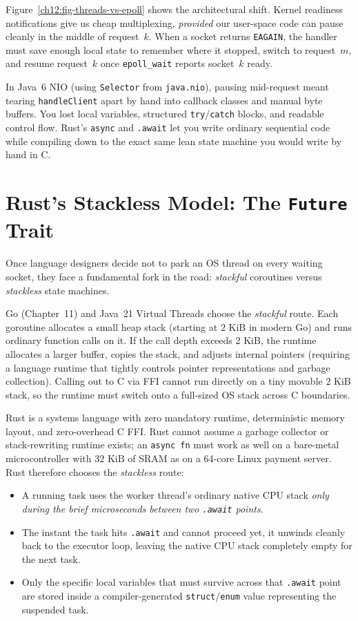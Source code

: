 Figure~\ref{ch12:fig-threads-vs-epoll} shows the architectural shift. Kernel readiness notifications give us cheap multiplexing, \emph{provided} our user-space code can pause cleanly in the middle of request~$k$. When a socket returns \texttt{EAGAIN}, the handler must save enough local state to remember where it stopped, switch to request~$m$, and resume request~$k$ once \texttt{epoll\_wait} reports socket~$k$ ready.

In Java~6 NIO (using \texttt{Selector} from \texttt{java.nio}), pausing mid-request meant tearing \texttt{handleClient} apart by hand into callback classes and manual byte buffers. You lost local variables, structured \texttt{try}/\texttt{catch} blocks, and readable control flow. Rust's \texttt{async} and \texttt{.await} let you write ordinary sequential code while compiling down to the exact same lean state machine you would write by hand in C.

\section{Rust's Stackless Model: The \texttt{Future} Trait}
\label{ch12:future-trait}

Once language designers decide not to park an OS thread on every waiting socket, they face a fundamental fork in the road: \emph{stackful} coroutines versus \emph{stackless} state machines.

Go (Chapter~11) and Java~21 Virtual Threads choose the \emph{stackful} route. Each goroutine allocates a small heap stack (starting at $2\text{ KiB}$ in modern Go) and runs ordinary function calls on it. If the call depth exceeds $2\text{ KiB}$, the runtime allocates a larger buffer, copies the stack, and adjusts internal pointers (requiring a language runtime that tightly controls pointer representations and garbage collection). Calling out to C via FFI cannot run directly on a tiny movable $2\text{ KiB}$ stack, so the runtime must switch onto a full-sized OS stack across C boundaries.

Rust is a systems language with zero mandatory runtime, deterministic memory layout, and zero-overhead C FFI. Rust cannot assume a garbage collector or stack-rewriting runtime exists; an \texttt{async fn} must work as well on a bare-metal microcontroller with $32\text{ KiB}$ of SRAM as on a 64-core Linux payment server. Rust therefore chooses the \emph{stackless} route:
\begin{itemize}
  \item A running task uses the worker thread's ordinary native CPU stack \emph{only during the brief microseconds between two \texttt{.await} points}.
  \item The instant the task hits \texttt{.await} and cannot proceed yet, it unwinds cleanly back to the executor loop, leaving the native CPU stack completely empty for the next task.
  \item Only the specific local variables that must survive across that \texttt{.await} point are stored inside a compiler-generated \texttt{struct}/\texttt{enum} value representing the suspended task.
\end{itemize}


